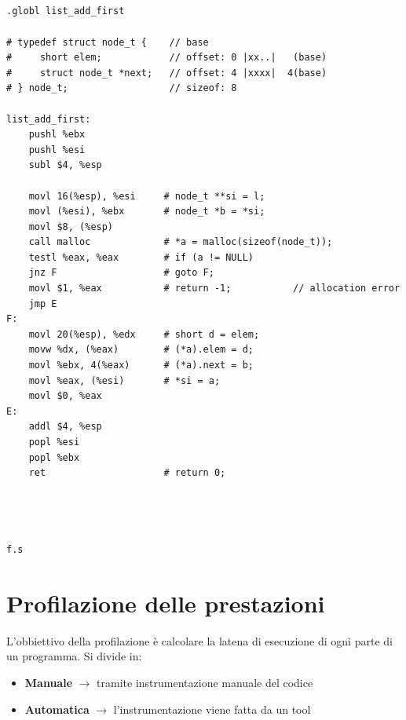 \begin{minipage}{0.53\textwidth}
    \begin{verbatim}




.globl list_add_first

# typedef struct node_t {    // base
#     short elem;            // offset: 0 |xx..|   (base)
#     struct node_t *next;   // offset: 4 |xxxx|  4(base)
# } node_t;                  // sizeof: 8

list_add_first:
    pushl %ebx
    pushl %esi
    subl $4, %esp

    movl 16(%esp), %esi     # node_t **si = l;
    movl (%esi), %ebx       # node_t *b = *si;
    movl $8, (%esp)
    call malloc             # *a = malloc(sizeof(node_t));
    testl %eax, %eax        # if (a != NULL) 
    jnz F                   # goto F;
    movl $1, %eax           # return -1;           // allocation error
    jmp E
F:
    movl 20(%esp), %edx     # short d = elem;
    movw %dx, (%eax)        # (*a).elem = d;
    movl %ebx, 4(%eax)      # (*a).next = b;
    movl %eax, (%esi)       # *si = a;
    movl $0, %eax
E:
    addl $4, %esp
    popl %esi
    popl %ebx
    ret 		            # return 0;




f.s
    \end{verbatim}
\end{minipage}
\newpage
\section{Profilazione delle prestazioni}
L'obbiettivo della profilazione è calcolare la latena di esecuzione
di ogni parte di un programma. Si divide in:
\begin{itemize}
    \item \textbf{Manuale} $\rightarrow$ tramite instrumentazione manuale
    del codice
    \item \textbf{Automatica} $\rightarrow$ l'instrumentazione viene fatta
    da un tool
\end{itemize}

